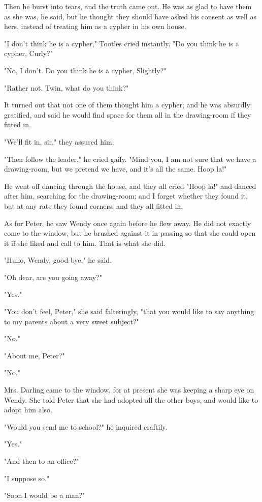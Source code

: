 Then he burst into tears, and the truth came out. He was as glad to have
them as she was, he said, but he thought they should have asked his
consent as well as hers, instead of treating him as a cypher in his
own house.


"I don't think he is a cypher," Tootles cried instantly. "Do you think he
is a cypher, Curly?"


"No, I don't. Do you think he is a cypher, Slightly?"


"Rather not. Twin, what do you think?"


It turned out that not one of them thought him a cypher; and he was
absurdly gratified, and said he would find space for them all in the
drawing-room if they fitted in.


"We'll fit in, sir," they assured him.


"Then follow the leader," he cried gaily. "Mind you, I am not sure that we
have a drawing-room, but we pretend we have, and it's all the same. Hoop
la!"


He went off dancing through the house, and they all cried "Hoop la!" and
danced after him, searching for the drawing-room; and I forget whether
they found it, but at any rate they found corners, and they all fitted in.


As for Peter, he saw Wendy once again before he flew away. He did not
exactly come to the window, but he brushed against it in passing so that
she could open it if she liked and call to him. That is what she did.


"Hullo, Wendy, good-bye," he said.


"Oh dear, are you going away?"


"Yes."


"You don't feel, Peter," she said falteringly, "that you would like to say
anything to my parents about a very sweet subject?"


"No."


"About me, Peter?"


"No."


Mrs. Darling came to the window, for at present she was keeping a sharp
eye on Wendy. She told Peter that she had adopted all the other boys, and
would like to adopt him also.


"Would you send me to school?" he inquired craftily.


"Yes."


"And then to an office?"


"I suppose so."


"Soon I would be a man?"


